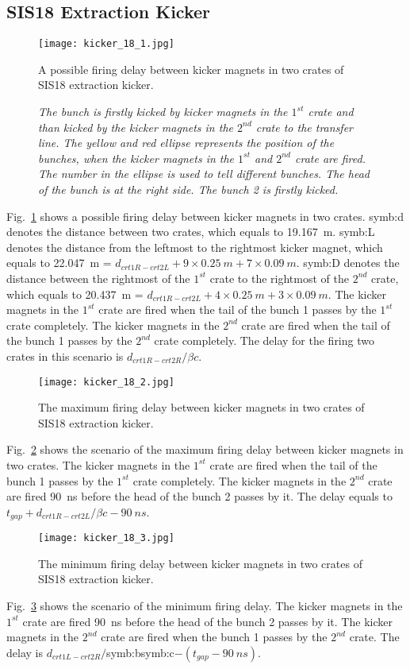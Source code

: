 \subsection{SIS18 Extraction Kicker}
\begin{figure}[H]
   \centering   
   \texttt{[image: kicker\_18\_1.jpg]}
   \caption{A possible firing delay between kicker magnets in two crates of SIS18 extraction kicker.}
	\caption*{\textsl{\small{The bunch is firstly kicked by kicker magnets in the $1^{st}$ crate and than kicked by the kicker magnets in the $2^{nd}$ crate to the transfer line. The yellow and red ellipse represents the position of the bunches, when the kicker magnets in the $1^{st}$ and $2^{nd}$ crate are fired. The number in the ellipse is used to tell different bunches. The head of the bunch is at the right side. The bunch 2 is firstly kicked. }}}
   \label{kicker_18_1}
\end{figure}
Fig.~\ref{kicker_18_1} shows a possible firing delay between kicker magnets in two crates. \gls{symb:d} denotes the distance between two crates, which equals to \SI{19.167}{m}. \gls{symb:L} denotes the distance from the leftmost to the rightmost kicker magnet, which equals to \SI{22.047}{m} = $d_\mathit{crt1R-crt2L} + 9\times \SI{0.25}{m} + 7\times \SI{0.09}{m}$. \gls{symb:D} denotes the distance between the rightmost of the $1^{st}$ crate to the rightmost of the $2^{nd}$ crate, which equals to \SI{20.437}{m} = $d_\mathit{crt1R-crt2L} + 4\times \SI{0.25}{m} + 3\times \SI{0.09}{m}$. The kicker magnets in the $1^{st}$ crate are fired when the tail of the bunch 1 passes by the $1^{st}$ crate completely. The kicker magnets in the $2^{nd}$ crate are fired when the tail of the bunch 1 passes by the $2^{nd}$ crate completely. The delay for the firing two crates in this scenario is $d_\mathit{crt1R-crt2R}/\beta c$. 
\begin{figure}[H]
   \centering   
   \texttt{[image: kicker\_18\_2.jpg]}
   \caption{The maximum firing delay between kicker magnets in two crates of SIS18 extraction kicker.}
   \label{kicker_18_2}
\end{figure}
Fig.~\ref{kicker_18_2} shows the scenario of the maximum firing delay between kicker magnets in two crates. The kicker magnets in the $1^{st}$ crate are fired when the tail of the bunch 1 passes by the $1^{st}$ crate completely. The kicker magnets in the $2^{nd}$ crate are fired \SI{90}{ns} before the head of the bunch 2 passes by it. The delay equals to $t_\mathit{gap}+d_\mathit{crt1R-crt2L}/\beta c-\SI{90}{ns}$.
\begin{figure}[H]
   \centering   
   \texttt{[image: kicker\_18\_3.jpg]}
   \caption{The minimum firing delay between kicker magnets in two crates of SIS18 extraction kicker.}
   \label{kicker_18_3}
\end{figure}
Fig.~\ref{kicker_18_3} shows the scenario of the minimum firing delay. The kicker magnets in the $1^{st}$ crate are fired \SI{90}{ns} before the head of the bunch 2 passes by it. The kicker magnets in the $2^{nd}$ crate are fired when the bunch 1 passes by the $2^{nd}$ crate. The delay is $d_\mathit{crt1L-crt2R}/$\gls{symb:b}\gls{symb:c}$-(t_\mathit{gap}-\SI{90}{ns})$.

